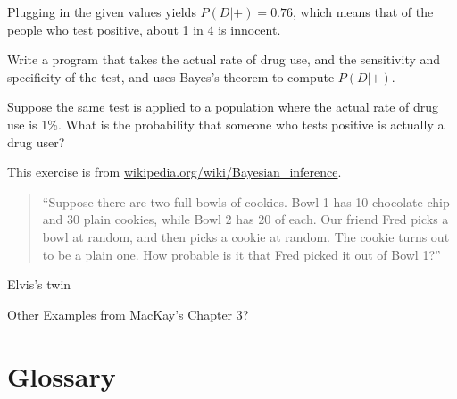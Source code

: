 \documentclass[12pt]{book}
\begin{document}
Plugging in the given values yields $P(D|+) = 0.76$, which means
that of the people who test positive, about 1 in 4 is innocent. 

\begin{ex}

Write a program that takes the actual rate of drug use, and the
sensitivity and specificity of the test, and uses Bayes's theorem
to compute $P(D|+)$.

Suppose the same test is applied to a population where the actual
rate of drug use is 1\%.  What is the probability that someone
who tests positive is actually a drug user?

\end{ex}


\begin{ex}

This exercise is from \url{wikipedia.org/wiki/Bayesian_inference}.

\begin{quote}

``Suppose there are two full bowls of cookies. Bowl 1 has 10 chocolate
  chip and 30 plain cookies, while Bowl 2 has 20 of each. Our friend
  Fred picks a bowl at random, and then picks a cookie at random. The
  cookie turns out to be a plain one. How probable is it that Fred
  picked it out of Bowl 1?''

\end{quote}

\end{ex}

\begin{ex}

Elvis's twin

Other Examples from MacKay's Chapter 3?

\end{ex}


\section{Glossary}
\end{document}
